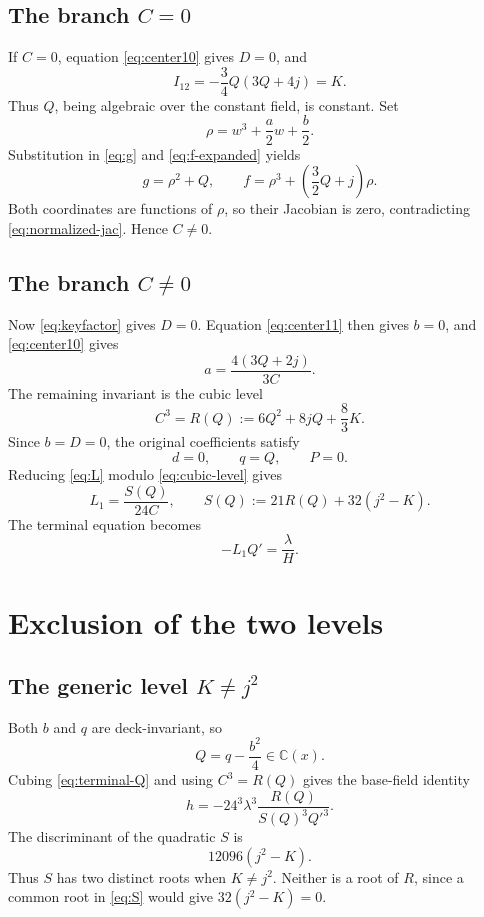 \documentclass[11pt]{article}
\theoremstyle{definition}
\theoremstyle{remark}
\newcommand{\C}{\mathbb C}
\begin{document}
\subsection{The branch \(C=0\)}

If \(C=0\), equation \eqref{eq:center10} gives \(D=0\), and
\[
 I_{12}=-\frac34Q(3Q+4j)=K.
\]
Thus \(Q\), being algebraic over the constant field, is constant.
Set
\[
 \rho=w^3+\frac a2w+\frac b2 .
\]
Substitution in \eqref{eq:g} and \eqref{eq:f-expanded} yields
\[
 g=\rho^2+Q,\qquad
 f=\rho^3+\left(\frac32Q+j\right)\rho.
\]
Both coordinates are functions of \(\rho\), so their Jacobian is zero,
contradicting \eqref{eq:normalized-jac}.  Hence \(C\neq0\).

\subsection{The branch \(C\neq0\)}

Now \eqref{eq:keyfactor} gives \(D=0\).
Equation \eqref{eq:center11} then gives \(b=0\), and
\eqref{eq:center10} gives
\begin{equation}
 a=\frac{4(3Q+2j)}{3C}.
\label{eq:a-centered}
\end{equation}
The remaining invariant is the cubic level
\begin{equation}
 \boxed{C^3=R(Q):=6Q^2+8jQ+\frac83K.}
\label{eq:cubic-level}
\end{equation}
Since \(b=D=0\), the original coefficients satisfy
\[
 d=0,\qquad q=Q,\qquad P=0.
\]
Reducing \eqref{eq:L} modulo \eqref{eq:cubic-level} gives
\begin{equation}
 L_1=\frac{S(Q)}{24C},\qquad
 S(Q):=21R(Q)+32(j^2-K).
\label{eq:S}
\end{equation}
The terminal equation becomes
\begin{equation}
 -L_1Q'=\frac{\lambda}{H}.
\label{eq:terminal-Q}
\end{equation}

\section{Exclusion of the two levels}
\label{sec:exclusion}

\subsection{The generic level \(K\neq j^2\)}

Both \(b\) and \(q\) are deck-invariant, so
\[
 Q=q-\frac{b^2}{4}\in\C(x).
\]
Cubing \eqref{eq:terminal-Q} and using \(C^3=R(Q)\) gives the
base-field identity
\begin{equation}
 \boxed{
 h=-24^3\lambda^3
 \frac{R(Q)}{S(Q)^3Q'^3}.
 }
\label{eq:h-rational}
\end{equation}
The discriminant of the quadratic \(S\) is
\[
 12096(j^2-K).
\]
Thus \(S\) has two distinct roots when \(K\neq j^2\).  Neither is a
root of \(R\), since a common root in \eqref{eq:S} would give
\(32(j^2-K)=0\).
\end{document}
